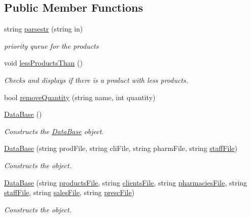\subsection*{Public Member Functions}
\begin{DoxyCompactItemize}
\item 
string \hyperlink{classDataBase_ad34d05002555ed7e109fdcfdfbeb70b8}{parsestr} (string in)
\begin{DoxyCompactList}\small\item\em priority queue for the products \end{DoxyCompactList}\item 
void \hyperlink{classDataBase_a6255a0d9489dee6c6de802bcfff2d19e}{less\+Products\+Than} ()
\begin{DoxyCompactList}\small\item\em Checks and displays if there is a product with less products. \end{DoxyCompactList}\item 
bool \hyperlink{classDataBase_a780ad993953bd70eaee64df86d0f1974}{remove\+Quantity} (string name, int quantity)
\item 
\hyperlink{classDataBase_a9fbd4936704ce4de391f92e92a072074}{Data\+Base} ()
\begin{DoxyCompactList}\small\item\em Constructs the \hyperlink{classDataBase}{Data\+Base} object. \end{DoxyCompactList}\item 
\hyperlink{classDataBase_a5a9bd40e9026abb30082e3d0590054d4}{Data\+Base} (string prod\+File, string cli\+File, string pharm\+File, string \hyperlink{classDataBase_a2f564a52132d74186314695a7a0e3270}{staff\+File})
\begin{DoxyCompactList}\small\item\em Constructs the object. \end{DoxyCompactList}\item 
\hyperlink{classDataBase_a5e9a28cc8e7c0d468c8f5bbeaad3a594}{Data\+Base} (string \hyperlink{classDataBase_a24acb8bdda9293336f40a4b08741235e}{products\+File}, string \hyperlink{classDataBase_a7b52741a2183b8b3eba86534d02782e6}{clients\+File}, string \hyperlink{classDataBase_aa52765a56e1fefddb5b1cf638de3493e}{pharmacies\+File}, string \hyperlink{classDataBase_a2f564a52132d74186314695a7a0e3270}{staff\+File}, string \hyperlink{classDataBase_a8b16f4814de788f12e96163255aaa737}{sales\+File}, string \hyperlink{classDataBase_a7649e7e3eda974285c99e78c23829334}{presc\+File})
\begin{DoxyCompactList}\small\item\em Constructs the object. \end{DoxyCompactList}\item 

\end{DoxyCompactItemize}
